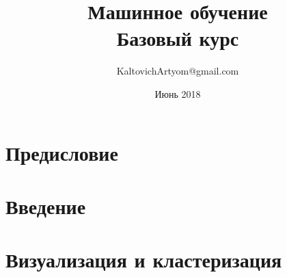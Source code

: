 \documentclass[a4paper,14pt, openany, oneside]{book}
\begin{document}
\title{\huge Машинное обучение \\ \Large Базовый курс \vspace{2cm}}
\author{\large KaltovichArtyom@gmail.com}
\date{\large Июнь 2018}
\maketitle

\tableofcontents

\chapter*{Предисловие}


\chapter*{Введение}



\chapter{Визуализация и кластеризация}



\printbibliography
\end{document}
